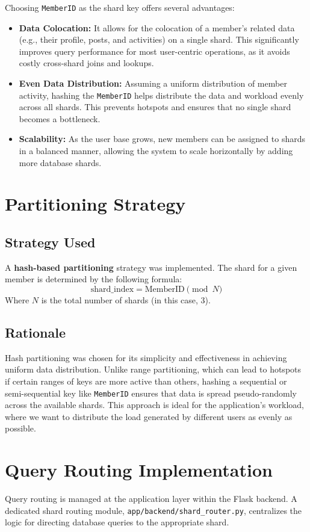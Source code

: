 \documentclass{article}
\begin{document}
Choosing \texttt{MemberID} as the shard key offers several advantages:
\begin{itemize}
    \item \textbf{Data Colocation:} It allows for the colocation of a member's related data (e.g., their profile, posts, and activities) on a single shard. This significantly improves query performance for most user-centric operations, as it avoids costly cross-shard joins and lookups.
    \item \textbf{Even Data Distribution:} Assuming a uniform distribution of member activity, hashing the \texttt{MemberID} helps distribute the data and workload evenly across all shards. This prevents hotspots and ensures that no single shard becomes a bottleneck.
    \item \textbf{Scalability:} As the user base grows, new members can be assigned to shards in a balanced manner, allowing the system to scale horizontally by adding more database shards.
\end{itemize}

\section{Partitioning Strategy}
\subsection{Strategy Used}
A \textbf{hash-based partitioning} strategy was implemented. The shard for a given member is determined by the following formula:
\[ \text{shard\_index} = \text{MemberID} \pmod{N} \]
Where $N$ is the total number of shards (in this case, 3).

\subsection{Rationale}
Hash partitioning was chosen for its simplicity and effectiveness in achieving uniform data distribution. Unlike range partitioning, which can lead to hotspots if certain ranges of keys are more active than others, hashing a sequential or semi-sequential key like \texttt{MemberID} ensures that data is spread pseudo-randomly across the available shards. This approach is ideal for the application's workload, where we want to distribute the load generated by different users as evenly as possible.

\section{Query Routing Implementation}
Query routing is managed at the application layer within the Flask backend. A dedicated shard routing module, \texttt{app/backend/shard\_router.py}, centralizes the logic for directing database queries to the appropriate shard.
\end{document}
